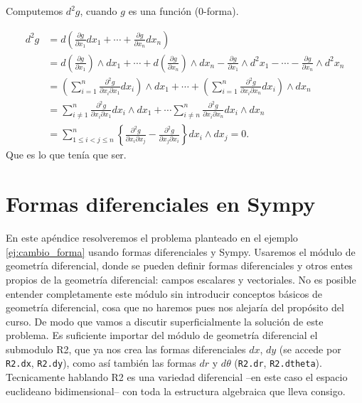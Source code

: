 \begin{subappendices}
\begin{ejemplo}{} Computemos $d^2g$, cuando $g$ es una función (0-forma).

\[
\begin{split}
d^2g&=d\left(\frac{\partial g}{\partial x_1}dx_1+\cdots+\frac{\partial g}{\partial x_n}dx_n\right)\\
&= d\left(\frac{\partial g}{\partial x_1}\right)\wedge dx_1+\cdots+d\left(\frac{\partial g}{\partial x_n}\right)\wedge dx_n
    -\frac{\partial g}{\partial x_1}\wedge d^2x_1-\cdots-\frac{\partial g}{\partial x_n}\wedge d^2x_n\\
    &=\left(\sum_{i=1}^n\frac{\partial^2g}{\partial x_i\partial x_1} dx_i\right)\wedge dx_1+\cdots+\left(\sum_{i=1}^n\frac{\partial^2g}{\partial x_i\partial x_n} dx_i\right)\wedge dx_n\\
    &= \sum_{i\neq 1}^n\frac{\partial^2g}{\partial x_i\partial x_1} dx_i\wedge dx_1+\cdots
    \sum_{i\neq n}^n\frac{\partial^2g}{\partial x_i\partial x_n} dx_i\wedge dx_n\\
    &=\sum_{1\leq i<j\leq n}^n\left\{\frac{\partial^2g}{\partial x_i\partial x_j}- \frac{\partial^2g}{\partial x_j\partial x_i}\right \} dx_i\wedge dx_j=0.
\end{split}
\]
Que es lo que tenía que ser.


\end{ejemplo}

\section{Formas diferenciales en Sympy}

En este apéndice resolveremos el problema planteado en el ejemplo \ref{ej:cambio_forma} usando formas diferenciales y Sympy.  Usaremos el módulo de geometría diferencial, donde se pueden definir formas diferenciales
y otros entes propios de la geometría diferencial: campos escalares  y
vectoriales. No es posible entender completamente este módulo sin introducir conceptos básicos de geometría diferencial, cosa que no haremos pues nos alejaría del propósito del curso. De modo que vamos a discutir superficialmente la solución de este problema.  Es suficiente importar del módulo de geometría diferencial el submodulo R2, que ya nos
crea las formas diferenciales $dx$, $dy$  (se accede por \texttt{R2.dx}, \texttt{R2.dy}), como
así también las formas $dr$ y $d\theta$ (\texttt{R2.dr}, \texttt{R2.dtheta}). Tecnicamente hablando R2 es una variedad diferencial --en este caso el espacio euclideano bidimensional-- con toda la estructura algebraica que lleva consigo.


\end{subappendices}
